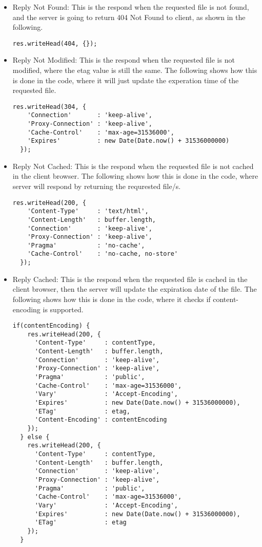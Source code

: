 \begin{itemize}
\item Reply Not Found: This is the respond when the requested file is not found, and the server is going to return 404 Not Found to client, as shown in the following.

\begin{lstlisting}
res.writeHead(404, {});
\end{lstlisting}

\item Reply Not Modified: This is the respond when the requested file is not modified, where the etag value is still the same. The following shows how this is done in the code, where it will just update the experation time of the requested file. 

\begin{lstlisting}
res.writeHead(304, {
    'Connection'       : 'keep-alive',
    'Proxy-Connection' : 'keep-alive',
    'Cache-Control'    : 'max-age=31536000',
    'Expires'          : new Date(Date.now() + 31536000000)
  });
\end{lstlisting}

\item Reply Not Cached: This is the respond when the requested file is not cached in the client browser. The following shows how this is done in the code, where server will respond by returning the requrested file/s.

\begin{lstlisting}
res.writeHead(200, {
    'Content-Type'     : 'text/html',
    'Content-Length'   : buffer.length,
    'Connection'       : 'keep-alive',
    'Proxy-Connection' : 'keep-alive',
    'Pragma'           : 'no-cache',
    'Cache-Control'    : 'no-cache, no-store'
  });
\end{lstlisting}

\item Reply Cached: This is the respond when the requested file is cached in the client browser, then the server will update the expiration date of the file. The following shows how this is done in the code, where it checks if content-encoding is supported.

\begin{lstlisting}
if(contentEncoding) {
    res.writeHead(200, {
      'Content-Type'     : contentType,
      'Content-Length'   : buffer.length,
      'Connection'       : 'keep-alive',
      'Proxy-Connection' : 'keep-alive',
      'Pragma'           : 'public',
      'Cache-Control'    : 'max-age=31536000',
      'Vary'             : 'Accept-Encoding',
      'Expires'          : new Date(Date.now() + 31536000000),
      'ETag'             : etag,
      'Content-Encoding' : contentEncoding
    });
  } else {
    res.writeHead(200, {
      'Content-Type'     : contentType,
      'Content-Length'   : buffer.length,
      'Connection'       : 'keep-alive',
      'Proxy-Connection' : 'keep-alive',
      'Pragma'           : 'public',
      'Cache-Control'    : 'max-age=31536000',
      'Vary'             : 'Accept-Encoding',
      'Expires'          : new Date(Date.now() + 31536000000),
      'ETag'             : etag
    });
  }\end{lstlisting}


\end{itemize}

